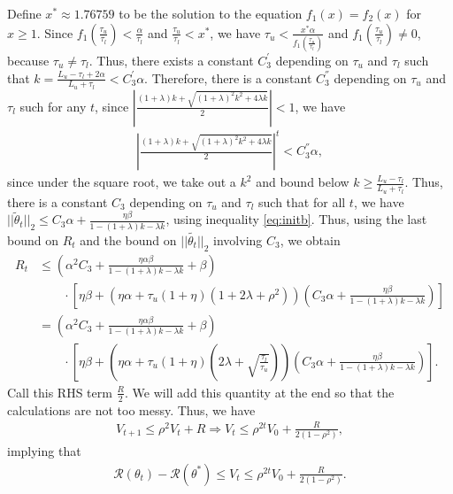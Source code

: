 \documentclass{article}
\begin{document}
Define $x^* \approx 1.76759$ to be the solution to the equation $f_1(x) = f_2(x)$ for $x \geq 1$. Since $f_1\left(\frac{\tau_u}{\tau_l}\right) < \frac{\alpha}{\tau_l}$ and $\frac{\tau_u}{\tau_l} < x^*$, we have $\tau_u < \frac{x^*\alpha}{f_1\left(\frac{\tau_u}{\tau_l}\right)}$ and $f_1\left(\frac{\tau_u}{\tau_l}\right) \neq 0$, because $\tau_u \neq \tau_l$. Thus, there exists a constant $C_3^{'}$ depending on $\tau_u$ and $\tau_l$ such that $k = \frac{L_u - \tau_l + 2\alpha}{L_u + \tau_l} < C_3^{'}\alpha$. Therefore, there is a constant $C_3^{''}$ depending on $\tau_u$ and $\tau_l$ such for any $t$, since $\left|\frac{(1 + \lambda)k + \sqrt{(1 + \lambda)^2k^2 + 4\lambda k}}{2}\right| < 1$, we have
\begin{align*}
\left|\frac{(1 + \lambda)k + \sqrt{(1 + \lambda)^2k^2 + 4\lambda k}}{2}\right|^t < C_3^{''}\alpha,
\end{align*}
since under the square root, we take out a $k^2$ and bound below $k \ge \frac{L_u - \tau_l}{L_u + \tau_l}$. Thus, there is a constant $C_3$ depending on $\tau_u$ and $\tau_l$ such that for all $t$, we have$||\widetilde{\theta}_t||_2 \leq C_3\alpha + \frac{\eta\beta}{1 - (1 + \lambda)k - \lambda k}$, using inequality \eqref{eq:initb}. Thus, using the last bound on $R_t$ and the bound on $||\widetilde{\theta_t}||_2$ involving $C_3$, we obtain
\begin{align*}
R_t &\leq \left(\alpha^2 C_3 + \frac{\eta\alpha\beta}{1 - (1 + \lambda)k - \lambda k} + \beta\right)\\
& \qquad \cdot \left[\eta\beta + \left(\eta\alpha + \tau_u(1 + \eta)(1 + 2\lambda + \rho^2)\right)\left(C_3\alpha + \frac{\eta\beta}{1 - (1 + \lambda)k - \lambda k}\right)\right]\\
&= \left(\alpha^2 C_3 + \frac{\eta\alpha\beta}{1 - (1 + \lambda)k - \lambda k} + \beta\right)\\
& \qquad \cdot \left[\eta\beta + \left(\eta\alpha + \tau_u(1 + \eta)\left(2\lambda + \sqrt{\frac{\tau_l}{\tau_u}}\right)\right)\left(C_3\alpha + \frac{\eta\beta}{1 - (1 + \lambda)k - \lambda k}\right)\right].
\end{align*}
Call this RHS term $\frac{R}{2}$. We will add this quantity at the end so that the calculations are not too messy. Thus, we have
\begin{align*}
V_{t + 1} \leq \rho^2V_t + R \Rightarrow V_t \leq \rho^{2t}V_0 + \frac{R}{2(1 - \rho^2)},
\end{align*}
implying that
\begin{align*}
\mathcal{R}(\theta_t) - \mathcal{R}(\theta^*) \leq V_t \leq \rho^{2t}V_0 + \frac{R}{2(1 - \rho^2)}.
\end{align*}
\end{document}
